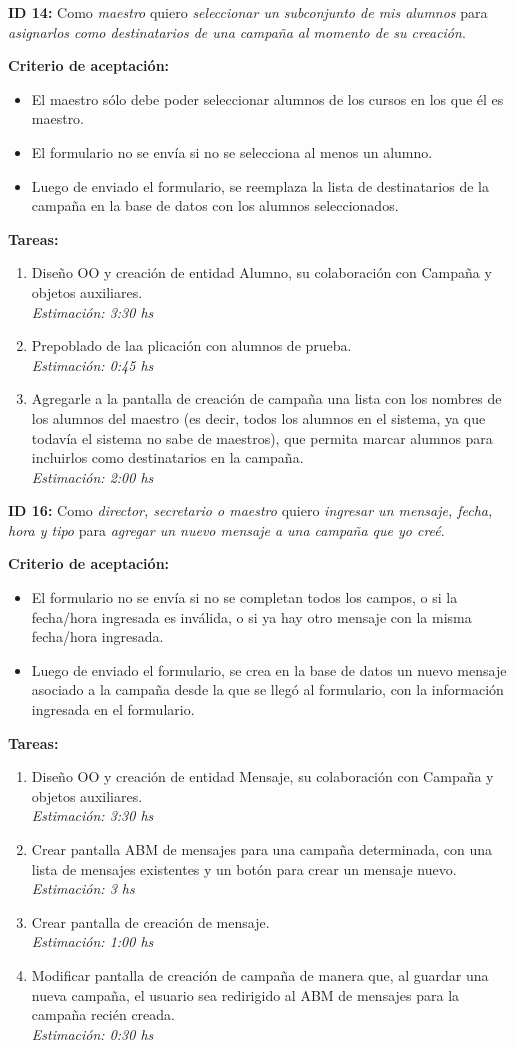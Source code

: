 \documentclass[a4paper, 10pt, twoside]{article}
\newcommand{\sprintstory}[4]{
  \noindent
  \textbf{ID #1:} Como \emph{#2} quiero \emph{#3} para \emph{#4}.
}
\newenvironment{criterios}{
  \textbf{Criterio de aceptación:}
  \begin{itemize}
}{
  \end{itemize}
}
\newcommand{\criterio}[1] {
  \item #1
}
\newenvironment{tasks}{
  \textbf{Tareas:}
  \begin{enumerate}
}{
  \end{enumerate}
}
\newcommand{\task}[2] {
  \item #1.\\
  \emph{Estimación: #2 hs}
}
\begin{document}
\sprintstory{14}
            {maestro}
            {seleccionar un subconjunto de mis alumnos}
            {asignarlos como destinatarios de una campaña al momento de su creación}

\begin{criterios}
  \criterio{El maestro sólo debe poder seleccionar alumnos de los cursos en los que él es maestro.}
  \criterio{El formulario no se envía si no se selecciona al menos un alumno.}
  \criterio{Luego de enviado el formulario, se reemplaza la lista de destinatarios de la campaña en la base de datos con los alumnos seleccionados.}
\end{criterios}

\begin{tasks}
  \task{Diseño OO y creación de entidad Alumno, su colaboración con Campaña y objetos auxiliares}{3:30}
  \task{Prepoblado de laa plicación con alumnos de prueba}{0:45}
  \task{Agregarle a la pantalla de creación de campaña una lista con los nombres de los alumnos del maestro (es decir, todos los alumnos en el sistema, ya que todavía el sistema no sabe de maestros), que permita marcar alumnos para incluirlos como destinatarios en la campaña}{2:00}
\end{tasks}


\sprintstory{16}
            {director, secretario o maestro}
            {ingresar un mensaje, fecha, hora y tipo}
            {agregar un nuevo mensaje a una campaña que yo creé}

\begin{criterios}
  \criterio{El formulario no se envía si no se completan todos los campos, o si la fecha/hora ingresada es inválida, o si ya hay otro mensaje con la misma fecha/hora ingresada.}
  \criterio{Luego de enviado el formulario, se crea en la base de datos un nuevo mensaje asociado a la campaña desde la que se llegó al formulario, con la información ingresada en el formulario.}
\end{criterios}

\begin{tasks}
  \task{Diseño OO y creación de entidad Mensaje, su colaboración con Campaña y objetos auxiliares}{3:30}
  \task{Crear pantalla ABM de mensajes para una campaña determinada, con una lista de mensajes existentes y un botón para crear un mensaje nuevo}{3}
  \task{Crear pantalla de creación de mensaje}{1:00}
  \task{Modificar pantalla de creación de campaña de manera que, al guardar una nueva campaña, el usuario sea redirigido al ABM de mensajes para la campaña recién creada}{0:30}
\end{tasks}
\end{document}
